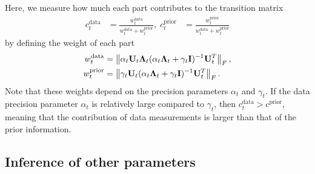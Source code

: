 \documentclass[journal]{IEEEtran}
\begin{document}
Here, we measure how much each part contributes to the transition matrix
\begin{equation}\label{eqn:data_contribution}
\begin{aligned}
    c^\text{data}_t&=\frac{w^\text{data}_t}{w^\text{data}_t+w^\text{prior}_t},\;c^\text{prior}_t&=\frac{w^\text{prior}_t}{w^\text{data}_t+w^\text{prior}_t}
\end{aligned}
\end{equation}
by defining the weight of each part
\begin{equation}
\begin{aligned}
    w^\text{data}_t&=\left\Vert\alpha_t{\bf{U}}_t{\bf{\Lambda}}_t(\alpha_t{\bf{\Lambda}}_t+\gamma_t{\bf{I}})^{-1}{\bf{U}}_t^T\right\Vert_F,\\
    w^\text{prior}_t&=\left\Vert\gamma_t{\bf{U}}_t(\alpha_t{\bf{\Lambda}}_t+\gamma_t{\bf{I}})^{-1}{\bf{U}}_t^T\right\Vert_F.
\end{aligned}
\end{equation}
Note that these weights depend on the precision parameters $\alpha_t$ and $\gamma_t$.
If the data precision parameter $\alpha_t$ is relatively large compared to $\gamma_t$,
then $c^\text{data}_t>c^\text{prior}$, meaning that the contribution of data measurements is larger than that of the prior information.


\subsection{Inference of other parameters}
\end{document}
